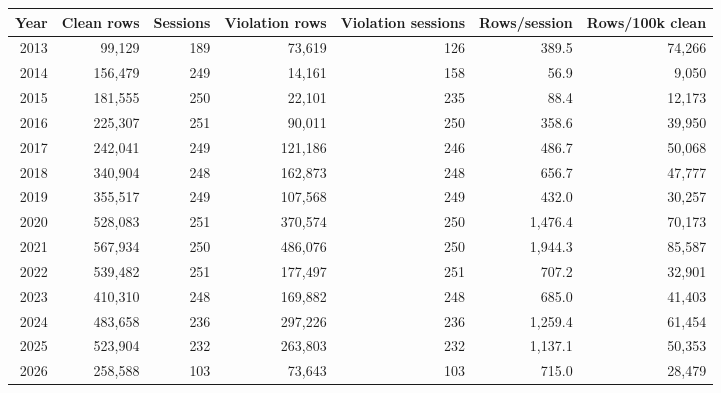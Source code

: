 \documentclass[11pt]{article}
\begin{document}
\begingroup
\scriptsize
\begin{longtable}{rrrrrrr}
\toprule
Year & Clean rows & Sessions & Violation rows & Violation sessions & Rows/session & Rows/100k clean \\
\midrule
2013 & 99,129 & 189 & 73,619 & 126 & 389.5 & 74,266 \\
2014 & 156,479 & 249 & 14,161 & 158 & 56.9 & 9,050 \\
2015 & 181,555 & 250 & 22,101 & 235 & 88.4 & 12,173 \\
2016 & 225,307 & 251 & 90,011 & 250 & 358.6 & 39,950 \\
2017 & 242,041 & 249 & 121,186 & 246 & 486.7 & 50,068 \\
2018 & 340,904 & 248 & 162,873 & 248 & 656.7 & 47,777 \\
2019 & 355,517 & 249 & 107,568 & 249 & 432.0 & 30,257 \\
2020 & 528,083 & 251 & 370,574 & 250 & 1,476.4 & 70,173 \\
2021 & 567,934 & 250 & 486,076 & 250 & 1,944.3 & 85,587 \\
2022 & 539,482 & 251 & 177,497 & 251 & 707.2 & 32,901 \\
2023 & 410,310 & 248 & 169,882 & 248 & 685.0 & 41,403 \\
2024 & 483,658 & 236 & 297,226 & 236 & 1,259.4 & 61,454 \\
2025 & 523,904 & 232 & 263,803 & 232 & 1,137.1 & 50,353 \\
2026 & 258,588 & 103 & 73,643 & 103 & 715.0 & 28,479 \\
\bottomrule
\end{longtable}
\endgroup
\end{document}
